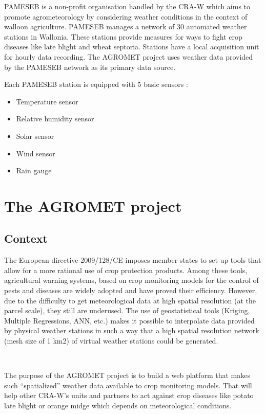 \documentclass[12pt,twoside]{reedthesis}
\providecommand{\tightlist}{%
  \setlength{\itemsep}{0pt}\setlength{\parskip}{0pt}}
\theoremstyle{definition}
\theoremstyle{definition}
\theoremstyle{definition}
\theoremstyle{remark}
\begin{document}
PAMESEB is a non-profit organisation handled by the CRA-W which aims to
promote agrometeorology by considering weather conditions in the context
of walloon agriculture. PAMESEB manages a network of 30 automated
weather stations in Wallonia. These stations provide measures for ways
to fight crop diseases like late blight and wheat septoria. Stations
have a local acquisition unit for hourly data recording. The AGROMET
project uses weather data provided by the PAMESEB network as its primary
data source.

Each PAMESEB station is equipped with 5 basic sensors :
\begin{itemize}
\tightlist
\item
  Temperature sensor
\item
  Relative humidity sensor
\item
  Solar sensor
\item
  Wind sensor
\item
  Rain gauge
\end{itemize}
\section{The AGROMET project}\label{the-agromet-project}

\subsection{Context}\label{context}

The European directive 2009/128/CE imposes member-states to set up tools
that allow for a more rational use of crop protection products. Among
these tools, agricultural warning systems, based on crop monitoring
models for the control of pests and diseases are widely adopted and have
proved their efficiency. However, due to the difficulty to get
meteorological data at high spatial resolution (at the parcel scale),
they still are underused. The use of geostatistical tools (Kriging,
Multiple Regressions, ANN, etc.) makes it possible to interpolate data
provided by physical weather stations in such a way that a high spatial
resolution network (mesh size of 1 km2) of virtual weather stations
could be generated.

~

The purpose of the AGROMET project is to build a web platform that makes
such ``spatialized'' weather data available to crop monitoring models.
That will help other CRA-W's units and partners to act against crop
diseases like potato late blight or orange midge which depends on
meteorological conditions.
\end{document}
